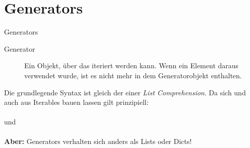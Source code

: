 \section{Generators}
\begin{frame}{Generators}
	\begin{description}
		\item[Generator] Ein Objekt, \"uber das iteriert werden kann. Wenn ein Element daraus verwendet wurde, ist es nicht mehr in dem Generatorobjekt enthalten.\\[.5cm]
	\end{description}
	
	Die grundlegende Syntax ist gleich der einer \textit{List Comprehension}.
	Da sich  und  auch aus Iterables bauen lassen gilt prinzipiell:\\[.25cm]

		\\[.25cm]
		und\\[.25cm]
		\\[.25cm]

	\textbf{Aber:} Generators verhalten sich anders als Lists oder Dicts!

\end{frame}





